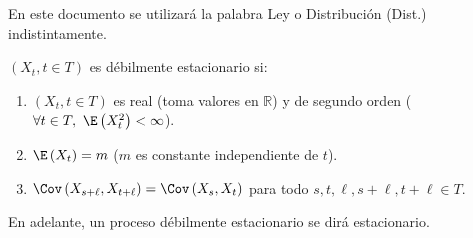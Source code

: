 En este documento se utilizar\'{a} la palabra Ley o Distribuci\'{o}n (Dist.) indistintamente.

\begin{definicion}$(X_{t}, t\in T)$ es d\'{e}bilmente estacionario si:
\begin{enumerate}
\item $(X_{t}, t\in T)$ es real (toma valores en $\mathbb{R}$) y de segundo orden ($ \forall t\in T,\ \E\left( X_{t}^{2} \right)<\infty$).
\item $\E\left( X_{t} \right)=m$ ($m$ es constante independiente de $t$).
\item $\Cov\left( X_{s+\ell},X_{t+\ell} \right)=\Cov\left( X_{s},X_{t} \right)$ para todo $s, t, \ell, s+\ell, t+\ell\in T$.
\end{enumerate}
\end{definicion}

\begin{observacion}
  En adelante, un proceso d\'{e}bilmente estacionario se dir\'{a} estacionario.
\end{observacion}

